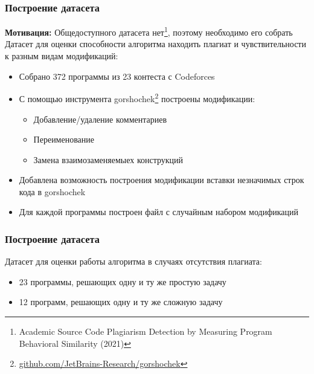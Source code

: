 \documentclass[10pt]{beamer}
\begin{document}
\begin{frame}\frametitle{Построение датасета}
	\textbf{Мотивация:} Общедоступного датасета нет\footnote[8,frame]{Academic Source Code Plagiarism Detection by Measuring Program Behavioral Similarity (2021)}, поэтому необходимо его собрать
	\newline
	\newline
	Датасет для оценки способности алгоритма находить плагиат и чувствительности к разным видам модификаций:
	\begin{itemize}
		\item Собрано 372 программы из 23 контеста с Codeforces
		\item С помощью инструмента gorshochek\footnote[9,frame]{\href{https://github.com/JetBrains-Research/gorshochek}{\color{blue}github.com/JetBrains-Research/gorshochek}} построены модификации:
		\begin{itemize} 
			\item Добавление/удаление комментариев
			\item Переименование
			\item Замена взаимозаменяемыех конструкций
		\end{itemize}
		\item Добавлена возможность построения модификации вставки незначимых строк кода в gorshochek
		\item Для каждой программы построен файл с случайным набором модификаций
	\end{itemize}
	
\end{frame}

\begin{frame}\frametitle{Построение датасета}
	Датасет для оценки работы алгоритма в случаях отсутствия плагиата:
	\begin{itemize}
		\item 23 программы, решающих одну и ту же простую задачу
		\item 12 программ, решающих одну и ту же сложную задачу
	\end{itemize}
	
\end{frame}
\end{document}
